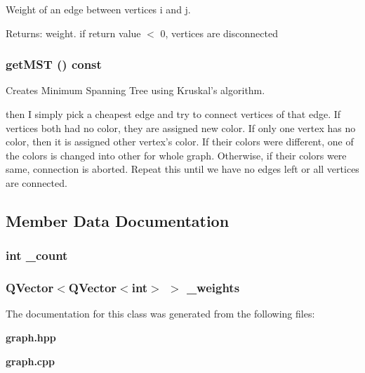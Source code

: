 Weight of an edge between vertices i and j. 

\begin{Desc}
\item[Returns:]weight. if return value $<$ 0, vertices are disconnected\end{Desc}
\subsubsection{ get\-MST () const}\label{classGraph_a5}


Creates Minimum Spanning Tree using Kruskal's algorithm. 

then I simply pick a cheapest edge and try to connect vertices of that edge. If vertices both had no color, they are assigned new color. If only one vertex has no color, then it is assigned other vertex's color. If their colors were different, one of the colors is changed into other for whole graph. Otherwise, if their colors were same, connection is aborted. Repeat this until we have no edges left or all vertices are connected.

\subsection{Member Data Documentation}
\subsubsection{\setlength{\rightskip}{0pt plus 5cm}int {\bf \_\-count}\hspace{0.3cm}{\tt  [protected]}}\label{classGraph_p0}


\subsubsection{\setlength{\rightskip}{0pt plus 5cm}QVector$<$QVector$<$int$>$ $>$ {\bf \_\-weights}\hspace{0.3cm}{\tt  [protected]}}\label{classGraph_p1}




The documentation for this class was generated from the following files:\begin{CompactItemize}
\item 
{\bf graph.hpp}\item 
{\bf graph.cpp}\end{CompactItemize}
